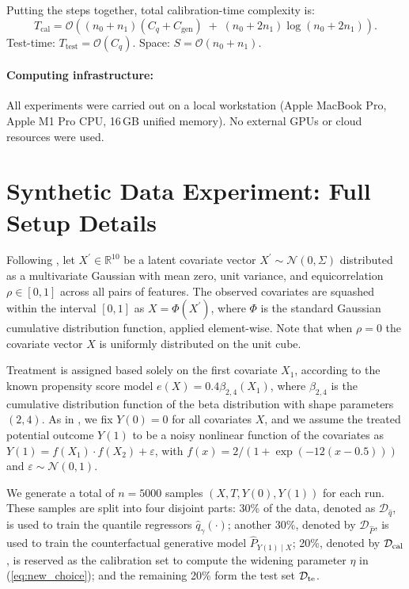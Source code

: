 \documentclass{article}
\theoremstyle{plain}
\theoremstyle{definition}
\theoremstyle{remark}
\begin{document}
Putting the steps together, total calibration-time complexity is:
\[
T_{\text{cal}}=\mathcal{O}\!\left((n_0+n_1)(C_q+C_{\text{gen}})\;+\;(n_0+2n_1)\log(n_0+2n_1)\right).
\]
Test-time: $T_{\text{test}}=\mathcal{O}(C_q)$. Space: $S=\mathcal{O}(n_0+n_1)$.

\paragraph{Computing infrastructure:}
All experiments were carried out on a local workstation (Apple MacBook Pro, Apple M1 Pro CPU, 16\,GB unified memory). No external GPUs or cloud resources were used.



\section{Synthetic Data Experiment: Full Setup Details}
\label{appendix:synthetic_setup}

Following \citep{wager2018estimation, lei2021conformal}, let $X^\prime \in \mathbb{R}^{10}$ be a latent covariate vector $X^\prime \sim \mathcal{N}(0, \Sigma)$ distributed as a multivariate Gaussian with mean zero, unit variance, and equicorrelation $\rho \in [0,1]$ across all pairs of features. The observed covariates are squashed within the interval $[0,1]$ as $X = \Phi(X^\prime)$, where $\Phi$ is the standard Gaussian cumulative distribution function, applied element-wise. Note that when $\rho = 0$ the covariate vector $X$ is uniformly distributed on the unit cube.

Treatment is assigned based solely on the first covariate $X_1$, according to the known propensity score model $e(X) = 0.4\beta_{2,4}(X_1)$, where $\beta_{2,4}$ is the cumulative distribution function of the beta distribution with shape parameters $(2,4)$. As in \citep{lei2021conformal}, we fix $Y(0)= 0$ for all covariates $X$, and we assume the treated potential outcome $Y(1)$ to be a noisy nonlinear function of the covariates as $Y(1) = f(X_1) \cdot f(X_2) + \varepsilon$, with $f(x) = 2/(1 + \exp(-12(x - 0.5)))$ and $\varepsilon \sim \mathcal{N}(0,1)$.

We generate a total of \( n = 5000 \) samples \((X, T, Y(0), Y(1))\) for each run. These samples are split into four disjoint parts:
30\% of the data, denoted as \(\mathcal{D}_{\hat{q}}\), is used to train the quantile regressors \(\hat{q}_\gamma(\cdot)\);
another 30\%, denoted by \(\mathcal{D}_{ \hat{P}}\), is used to train the counterfactual generative model \(\hat{P}_{Y(1)\mid X}\);
20\%, denoted by \(\mathcal{D}_{\rm cal}\), is reserved as the calibration set to compute the widening parameter \(\eta\) in (\ref{eq:new_choice}); and the remaining 20\% form the test set \(\mathcal{D}_{\rm te}\).
\end{document}
